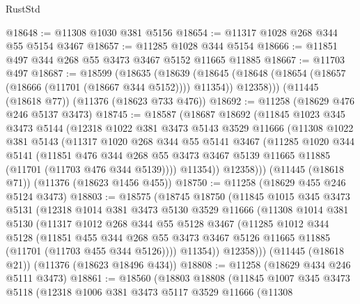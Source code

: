 \begin{lexlean}{RustStd}
\begin{coremodule}
{\begin{coremodule}
{{{{{{{{{{{{{{{{{{{{{{{{{{{{{{{{{{{{{{{{{{{{{{{{{{{{{{{{{{{{{{{{{{{{{{{{{{{{{{{{{{{{{@18648 := @11308 @1030 @381 @5156
@18654 := @11317 @1028 @268 @344 @55 @5154 @3467
@18657 := @11285 @1028 @344 @5154
@18666 := @11851 @497 @344 @268 @55 @3473 @3467 @5152 @11665 @11885
@18667 := @11703 @497
@18687 := @18599
    (@18635
      (@18639
        (@18645 (@18648 (@18654 (@18657 (@18666 (@11701 (@18667 @344 @5152)))) @11354)) @12358)))
    (@11445 (@18618 @77))
    (@11376 (@18623 @733 @476))
@18692 := @11258 (@18629 @476 @246 @5137 @3473)
@18745 := @18587
    (@18687
      @18692
      (@11845
        @1023
        @345
        @3473
        @5144
        (@12318
          @1022
          @381
          @3473
          @5143
          @3529
          @11666
          (@11308
            @1022
            @381
            @5143
            (@11317
              @1020
              @268
              @344
              @55
              @5141
              @3467
              (@11285
                @1020
                @344
                @5141
                (@11851
                  @476
                  @344
                  @268
                  @55
                  @3473
                  @3467
                  @5139
                  @11665
                  @11885
                  (@11701 (@11703 @476 @344 @5139))))
              @11354))
          @12358)))
    (@11445 (@18618 @71))
    (@11376 (@18623 @1456 @455))
@18750 := @11258 (@18629 @455 @246 @5124 @3473)
@18803 := @18575
    (@18745
      @18750
      (@11845
        @1015
        @345
        @3473
        @5131
        (@12318
          @1014
          @381
          @3473
          @5130
          @3529
          @11666
          (@11308
            @1014
            @381
            @5130
            (@11317
              @1012
              @268
              @344
              @55
              @5128
              @3467
              (@11285
                @1012
                @344
                @5128
                (@11851
                  @455
                  @344
                  @268
                  @55
                  @3473
                  @3467
                  @5126
                  @11665
                  @11885
                  (@11701 (@11703 @455 @344 @5126))))
              @11354))
          @12358)))
    (@11445 (@18618 @21))
    (@11376 (@18623 @18496 @434))
@18808 := @11258 (@18629 @434 @246 @5111 @3473)
@18861 := @18560
    (@18803
      @18808
      (@11845
        @1007
        @345
        @3473
        @5118
        (@12318
          @1006
          @381
          @3473
          @5117
          @3529
          @11666
          (@11308
}}}}}}}}}}}}}}}}}}}}}}}}}}}}}}}}}}}}}}}}}}}}}}}}}}}}}}}}}}}}}}}}}}}}}}}}}}}}}}}}}}}}}
\end{coremodule}}
\end{coremodule}
\end{lexlean}
